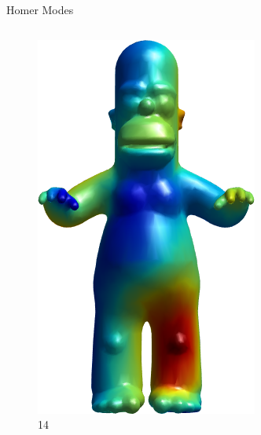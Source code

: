 \documentclass{beamer}
\begin{document}
\begin{frame}{Homer Modes}
\begin{columns}
\begin{column}[T]{3cm}
\begin{figure}[t]
    \includegraphics[width=\textwidth]{Harmonics/HomerModes/14.png}
    \caption*{\huge 14}
\end{figure}
\end{column}
\end{columns}

\end{frame}
\end{document}
